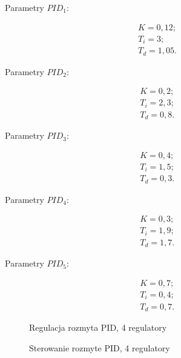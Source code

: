 Parametry $PID_1$:

\begin{equation}
\begin{matrix}
    	K = 0,12;\\
    	T_i = 3;\\
    	T_d = 1,05.
\end{matrix}
\end{equation}

Parametry $PID_2$:

\begin{equation}
\begin{matrix}
    	K = 0,2;\\
    	T_i = 2,3;\\
    	T_d = 0,8.
\end{matrix}
\end{equation}

Parametry $PID_3$:

\begin{equation}
\begin{matrix}
    	K = 0,4;\\
    	T_i = 1,5;\\
    	T_d = 0,3.
\end{matrix}
\end{equation}

Parametry $PID_4$:

\begin{equation}
\begin{matrix}
    	K = 0,3;\\
    	T_i = 1,9;\\
    	T_d = 1,7.
\end{matrix}
\end{equation}

Parametry $PID_5$:

\begin{equation}
\begin{matrix}
    	K = 0,7;\\
    	T_i = 0,4;\\
    	T_d = 0,7.
\end{matrix}
\end{equation}


\begin{figure}[H]
\centering

\caption{Regulacja rozmyta PID, 4 regulatory}
\end{figure}

\begin{figure}[H]
\centering

\caption{Sterowanie rozmyte PID, 4 regulatory}
\end{figure}

